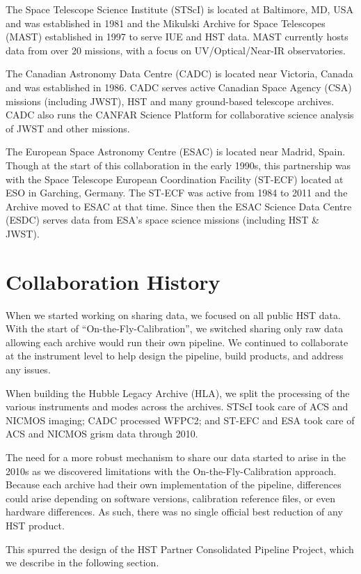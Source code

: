 \documentclass[11pt,twoside]{article}
\begin{document}
The Space Telescope Science Institute (STScI) is located at Baltimore, MD, USA and was established in 1981 and the Mikulski Archive for Space Telescopes (MAST) established in 1997 to serve IUE and HST data. MAST currently hosts data from over 20 missions, with a focus on UV/Optical/Near-IR observatories.

The Canadian Astronomy Data Centre (CADC) is located near Victoria, Canada and was established in 1986.
CADC serves active Canadian Space Agency (CSA) missions (including JWST), HST and many ground-based telescope archives.
CADC also runs the CANFAR Science Platform for collaborative science analysis of JWST and other missions.

The European Space Astronomy Centre (ESAC) is located near Madrid, Spain. Though at the start of this collaboration in the early 1990s, this partnership was with the Space Telescope European Coordination Facility (ST-ECF) located at ESO in Garching, Germany. 
The ST-ECF was active from 1984 to 2011 and the Archive moved to ESAC at that time. 
Since then the ESAC Science Data Centre (ESDC) serves data from ESA's space science missions (including HST \& JWST).

\section{Collaboration History}

When we started working on sharing data, we focused on all public HST data. 
With the start of “On-the-Fly-Calibration”, we switched sharing only raw data allowing each archive would run their own pipeline. 
We continued to collaborate at the instrument level to help design the pipeline, build products, and address any issues.

When building the Hubble Legacy Archive (HLA), we split the processing of the various instruments and modes across the archives. 
STScI took care of ACS and NICMOS imaging; CADC processed WFPC2; and ST-EFC and ESA took care of ACS and NICMOS grism data through 2010. 

The need for a more robust mechanism to share our data started to arise in the 2010s as we discovered limitations with the On-the-Fly-Calibration approach. 
Because each archive had their own implementation of the pipeline, differences could arise depending on software versions, calibration reference files, or even hardware differences. 
As such, there was no single official best reduction of any HST product. 

This spurred the design of the HST Partner Consolidated Pipeline Project, which we describe in the following section.
\end{document}
